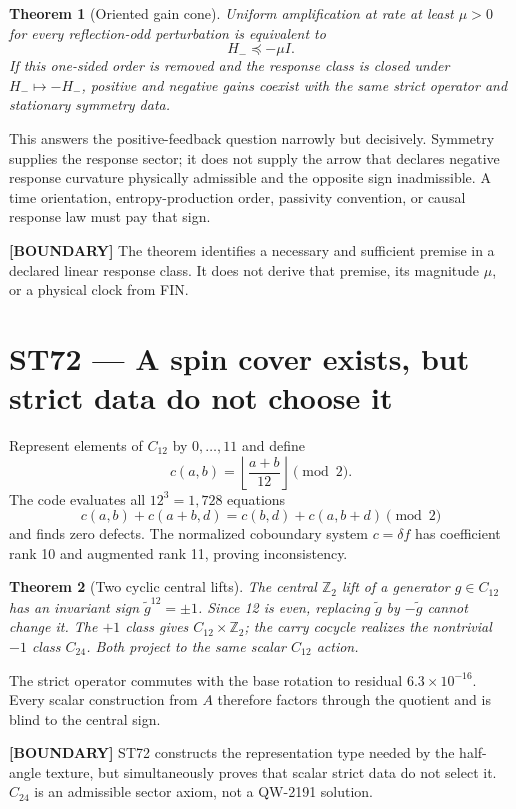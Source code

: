 \documentclass[11pt,a4paper]{article}
\newtheorem{theorem}{Theorem}[section]
\newcommand{\statusboundary}{\textcolor{orange!80!black}{\textbf{[BOUNDARY]}}}
\begin{document}
\begin{theorem}[Oriented gain cone]
Uniform amplification at rate at least $\mu>0$ for every reflection-odd perturbation is equivalent to
\[
H_-\preceq-\mu I.
\]
If this one-sided order is removed and the response class is closed under $H_-\mapsto-H_-$, positive and negative gains coexist with the same strict operator and stationary symmetry data.
\end{theorem}

This answers the positive-feedback question narrowly but decisively. Symmetry supplies the response sector; it does not supply the arrow that declares negative response curvature physically admissible and the opposite sign inadmissible. A time orientation, entropy-production order, passivity convention, or causal response law must pay that sign.

\statusboundary{} The theorem identifies a necessary and sufficient premise in a declared linear response class. It does not derive that premise, its magnitude $\mu$, or a physical clock from FIN.

\section{ST72 --- A spin cover exists, but strict data do not choose it}

Represent elements of $C_{12}$ by $0,\dots,11$ and define
\[
c(a,b)=\left\lfloor\frac{a+b}{12}\right\rfloor\pmod2.
\]
The code evaluates all $12^3=1{,}728$ equations
\[
c(a,b)+c(a+b,d)=c(b,d)+c(a,b+d)\pmod2
\]
and finds zero defects. The normalized coboundary system $c=\delta f$ has coefficient rank 10 and augmented rank 11, proving inconsistency.

\begin{theorem}[Two cyclic central lifts]
The central $\mathbb Z_2$ lift of a generator $g\in C_{12}$ has an invariant sign $\widetilde g^{12}=\pm1$. Since 12 is even, replacing $\widetilde g$ by $-\widetilde g$ cannot change it. The $+1$ class gives $C_{12}\times\mathbb Z_2$; the carry cocycle realizes the nontrivial $-1$ class $C_{24}$. Both project to the same scalar $C_{12}$ action.
\end{theorem}

The strict operator commutes with the base rotation to residual $6.3\times10^{-16}$. Every scalar construction from $A$ therefore factors through the quotient and is blind to the central sign.

\statusboundary{} ST72 constructs the representation type needed by the half-angle texture, but simultaneously proves that scalar strict data do not select it. $C_{24}$ is an admissible sector axiom, not a QW-2191 solution.
\end{document}
